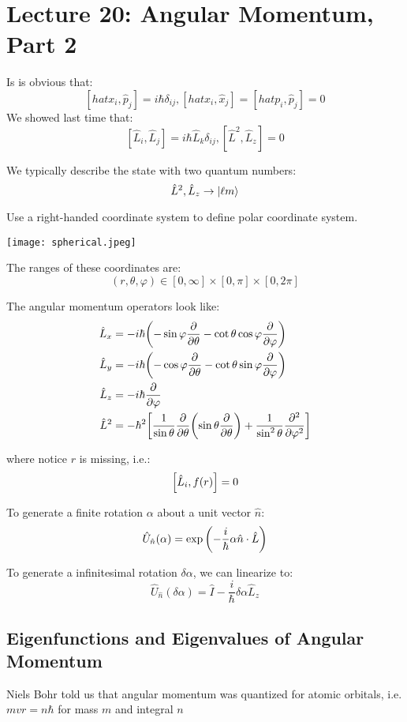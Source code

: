 \section{Lecture 20: Angular Momentum, Part 2}

Is is obvious that:
\[ [hat{x}_i, \hat{p}_j] = i \hbar \delta_{ij}, [hat{x}_i, \hat{x}_j] = [hat{p}_i, \hat{p}_j] = 0 \]
We showed last time that:
\[ [\hat{L}_i, \hat{L}_j] = i \hbar \hat{L}_k \delta_{ij}, [\hat{L}^2, \hat{L}_z] = 0 \]

We typically describe the state with two quantum numbers:
\[ \hat{L}^2, \hat{L}_z \to \ket{\ell m}  \]

Use a right-handed coordinate system to define polar coordinate system.

\texttt{[image: spherical.jpeg]}

The ranges of these coordinates are:
\[ (r, \theta, \varphi) \in [0, \infty] \times [0, \pi] \times [0, 2\pi]\]

The angular momentum operators look like:
\begin{align*}
    \hat{L}_x &= -i\hbar\qty(- \sin \varphi \pdv{}{\theta} - \cot \theta \cos \varphi \pdv{}{\varphi}) \\
    \hat{L}_y &= -i\hbar\qty(- \cos \varphi \pdv{}{\theta} - \cot \theta \sin \varphi \pdv{}{\varphi}) \\
    \hat{L}_z &= -i\hbar \pdv{}{\varphi} \\
    \hat{L}^2 &= -\hbar^2\qty[\frac{1}{\sin \theta} \pdv{}{\theta} \qty(\sin \theta \pdv{}{\theta}) + \frac{1}{\sin^2\theta} \pdv{^2}{\varphi^2}]
\end{align*}

where notice $r$ is missing, i.e.:
\[ \comm{\hat{L}_i}{f(r)} = 0 \]

\begin{theorem}
    To generate a finite rotation $\alpha$ about a unit vector $\hat{n}$:
    \[ \hat{U}_{\hat{n}}(\alpha) = \exp\qty(- \frac{i}{\hbar} \alpha \hat{n} \cdot \hat{L})\]

    To generate a infinitesimal rotation $\delta \alpha$, we can linearize to:
    \[ \hat{U}_{\hat{n}}(\delta\alpha) = \hat{I} - \frac{i}{\hbar} \delta\alpha \hat{L}_z\]
\end{theorem}

\subsection{Eigenfunctions and Eigenvalues of Angular Momentum}
Niels Bohr told us that angular momentum was quantized for atomic orbitals, i.e. $mvr = n \hbar$ for mass $m$ and integral $n$

